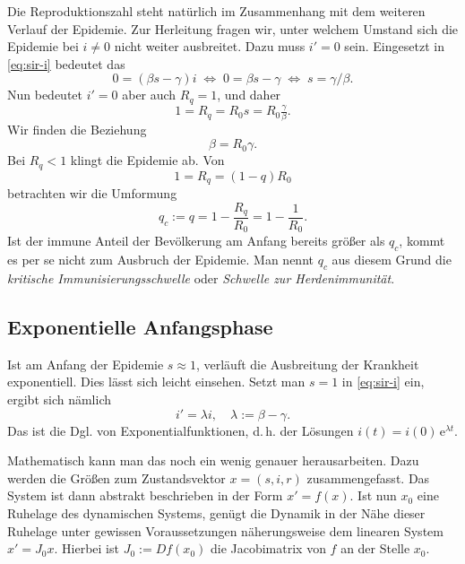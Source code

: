 \documentclass[a4paper,10pt,fleqn,twocolumn,twoside,dvipdfmx]{scrartcl}
\numberwithin{equation}{section}
\newcommand{\ee}{\mathrm e}
\begin{document}
Die Reproduktionszahl steht natürlich im Zusammenhang mit dem weiteren
Verlauf der Epidemie. Zur Herleitung fragen wir, unter welchem Umstand
sich die Epidemie bei $i\ne 0$ nicht weiter ausbreitet. Dazu muss
$i'=0$ sein. Eingesetzt in \eqref{eq:sir-i} bedeutet das%
\begin{equation}
0 = (\beta s - \gamma) i \;\Leftrightarrow\; 0 = \beta s - \gamma
\;\Leftrightarrow\; s = \gamma/\beta.
\end{equation}
Nun bedeutet $i'=0$ aber auch $R_q=1$, und daher %
\begin{equation}\label{eq:R0-beta-gamma-from-Rq}
1 = R_q = R_0 s = R_0 \tfrac{\gamma}{\beta}.
\end{equation}
Wir finden die Beziehung
\begin{equation}
\beta = R_0\gamma.
\end{equation}
Bei $R_q<1$ klingt die Epidemie ab. Von
\begin{equation}
1 = R_q = (1-q)R_0
\end{equation}
betrachten wir die Umformung
\begin{equation}
q_c := q = 1-\frac{R_q}{R_0} = 1-\frac{1}{R_0}.
\end{equation}
Ist der immune Anteil der Bevölkerung am Anfang bereits größer
als $q_c$, kommt es per se nicht zum Ausbruch der Epidemie. Man nennt
$q_c$ aus diesem Grund die \emph{kritische Immunisierungsschwelle} oder
\emph{Schwelle zur Herdenimmunität}.

\subsection{Exponentielle Anfangsphase}

Ist am Anfang der Epidemie $s\approx 1$, verläuft die Ausbreitung
der Krankheit exponentiell. Dies lässt sich leicht einsehen. Setzt
man $s=1$ in \eqref{eq:sir-i} ein, ergibt sich nämlich%
\begin{equation}\label{eq:i-ode-exp}
i' = \lambda i,\quad \lambda := \beta-\gamma.
\end{equation}
Das ist die Dgl. von Exponentialfunktionen, d.\,h. der Lösungen
$i(t) = i(0)\,\ee^{\lambda t}$.

Mathematisch kann man das noch ein wenig genauer herausarbeiten.
Dazu werden die Größen zum Zustandsvektor $x=(s,i,r)$ zusammengefasst.
Das System ist dann abstrakt beschrieben in der Form $x'=f(x)$. Ist
nun $x_0$ eine Ruhelage des dynamischen Systems, genügt die Dynamik
in der Nähe dieser Ruhelage unter gewissen Voraussetzungen
näherungsweise dem linearen System $x' = J_0 x$. Hierbei ist
$J_0:=Df(x_0)$ die Jacobimatrix von $f$ an der Stelle $x_0$.
\end{document}
